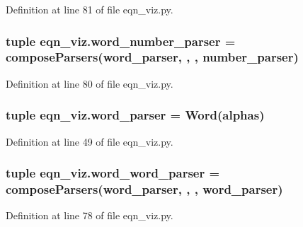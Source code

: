 Definition at line 81 of file eqn\+\_\+viz.\+py.

\hypertarget{namespaceeqn__viz_a125896c7d7db5d4f150b2b6699176c2a}{}
\subsubsection[{word\+\_\+number\+\_\+parser}]{\setlength{\rightskip}{0pt plus 5cm}tuple eqn\+\_\+viz.\+word\+\_\+number\+\_\+parser = {\bf compose\+Parsers}({\bf word\+\_\+parser}, \textquotesingle{},\textquotesingle{} , {\bf number\+\_\+parser})}\label{namespaceeqn__viz_a125896c7d7db5d4f150b2b6699176c2a}


Definition at line 80 of file eqn\+\_\+viz.\+py.

\hypertarget{namespaceeqn__viz_ad9dc00d4b3c0b288d0f204937297b179}{}
\subsubsection[{word\+\_\+parser}]{\setlength{\rightskip}{0pt plus 5cm}tuple eqn\+\_\+viz.\+word\+\_\+parser = Word(alphas)}\label{namespaceeqn__viz_ad9dc00d4b3c0b288d0f204937297b179}


Definition at line 49 of file eqn\+\_\+viz.\+py.

\hypertarget{namespaceeqn__viz_aaabd8c0ea3860c55e9022abed90dab61}{}
\subsubsection[{word\+\_\+word\+\_\+parser}]{\setlength{\rightskip}{0pt plus 5cm}tuple eqn\+\_\+viz.\+word\+\_\+word\+\_\+parser = {\bf compose\+Parsers}({\bf word\+\_\+parser}, \textquotesingle{},\textquotesingle{} , {\bf word\+\_\+parser})}\label{namespaceeqn__viz_aaabd8c0ea3860c55e9022abed90dab61}


Definition at line 78 of file eqn\+\_\+viz.\+py.

\hypertarget{namespaceeqn__viz_aff7c3fc95453270d356d2c9fef5be210}{}
